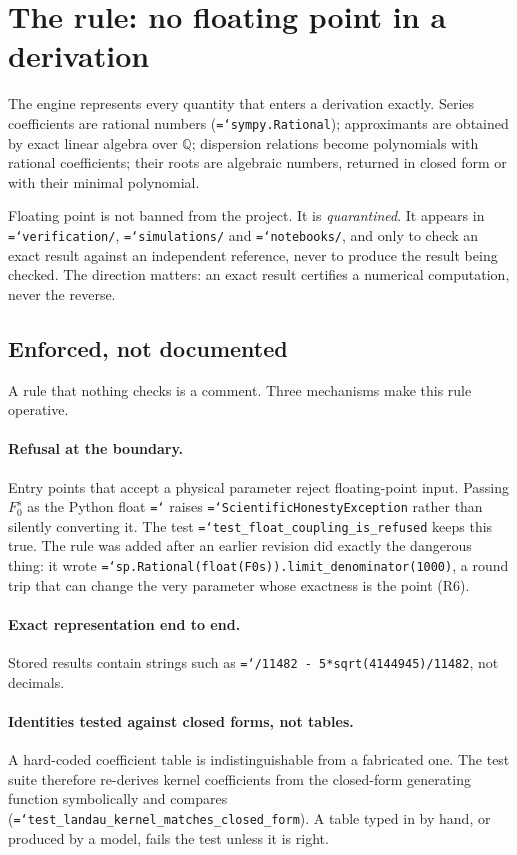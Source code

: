 \documentclass[11pt,a4paper,openany]{book}
\newcommand{\Fzs}{F_0^{s}}
\newcommand{\code}[1]{\texttt{\hyphenchar\font=`\-\relax #1}}
\newcommand{\Q}{\mathbb{Q}}
\theoremstyle{definition}
\theoremstyle{plain}
\begin{document}
\section{The rule: no floating point in a derivation}

The engine represents every quantity that enters a derivation exactly. Series coefficients are
rational numbers (\code{sympy.Rational}); approximants are obtained by exact linear algebra over
$\Q$; dispersion relations become polynomials with rational coefficients; their roots are
algebraic numbers, returned in closed form or with their minimal polynomial.

Floating point is not banned from the project. It is \emph{quarantined}. It appears in
\code{verification/}, \code{simulations/} and \code{notebooks/}, and only to check an exact
result against an independent reference, never to produce the result being checked. The
direction matters: an exact result certifies a numerical computation, never the reverse.

\subsection{Enforced, not documented}

A rule that nothing checks is a comment. Three mechanisms make this rule operative.

\paragraph{Refusal at the boundary.} Entry points that accept a physical parameter reject
floating-point input. Passing $\Fzs$ as the Python float \code{9.3} raises
\code{ScientificHonestyException} rather than silently converting it. The test
\code{test\_float\_coupling\_is\_refused} keeps this true. The rule was added after an earlier
revision did exactly the dangerous thing: it wrote
\code{sp.Rational(float(F0s)).limit\_denominator(1000)}, a round trip that can change the very
parameter whose exactness is the point (R6).

\paragraph{Exact representation end to end.} Stored results contain strings such as
\code{13265/11482 - 5*sqrt(4144945)/11482}, not decimals.

\paragraph{Identities tested against closed forms, not tables.} A hard-coded coefficient table is
indistinguishable from a fabricated one. The test suite therefore re-derives kernel coefficients
from the closed-form generating function symbolically and compares
(\code{test\_landau\_kernel\_matches\_closed\_form}). A table typed in by hand, or produced by a
model, fails the test unless it is right.
\end{document}
